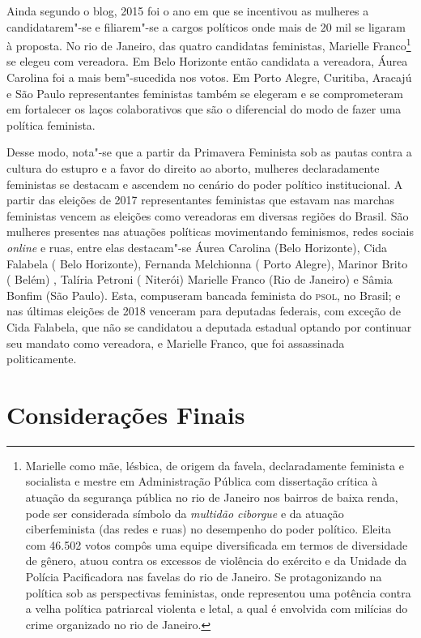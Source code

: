 Ainda segundo o blog, 2015 foi o ano em que se incentivou as mulheres a
candidatarem"-se e filiarem"-se a cargos políticos onde mais de 20 mil se
ligaram à proposta. No rio de Janeiro, das quatro candidatas feministas,
Marielle Franco\footnote{Marielle como mãe, lésbica, de origem da
  favela, declaradamente feminista e socialista e mestre em
  Administração Pública com dissertação crítica à atuação da segurança
  pública no rio de Janeiro nos bairros de baixa renda, pode ser
  considerada símbolo da \textit{multidão ciborgue} e da atuação ciberfeminista
  (das redes e ruas) no desempenho do poder político. Eleita com 46.502
  votos compôs uma equipe diversificada em termos de diversidade de
  gênero, atuou contra os excessos de violência do exército e da Unidade
  da Polícia Pacificadora nas favelas do rio de Janeiro. Se
  protagonizando na política sob as perspectivas feministas, onde
  representou uma potência contra a velha política patriarcal violenta e
  letal, a qual é envolvida com milícias do crime organizado no rio de
  Janeiro.} se elegeu com vereadora. Em Belo Horizonte então candidata a
vereadora, Áurea Carolina foi a mais bem"-sucedida nos votos. Em Porto
Alegre, Curitiba, Aracajú e São Paulo representantes feministas também
se elegeram e se comprometeram em fortalecer os laços colaborativos que
são o diferencial do modo de fazer uma política feminista.

Desse modo, nota"-se que a partir da Primavera Feminista sob as pautas
contra a cultura do estupro e a favor do direito ao aborto, mulheres
declaradamente feministas se destacam e ascendem no cenário do poder
político institucional. A partir das eleições de 2017 representantes
feministas que estavam nas marchas feministas vencem as eleições como
vereadoras em diversas regiões do Brasil. São mulheres presentes nas
atuações políticas movimentando feminismos, redes sociais \textit{\textit{online}} e ruas,
entre elas destacam"-se Áurea Carolina (Belo Horizonte), Cida Falabela (
Belo Horizonte), Fernanda Melchionna ( Porto Alegre), Marinor Brito (
Belém) , Talíria Petroni ( Niterói) Marielle Franco (Rio de Janeiro) e
Sâmia Bonfim (São Paulo). Esta, compuseram bancada feminista do \textsc{psol}, no
Brasil; e nas últimas eleições de 2018 venceram para deputadas federais,
com exceção de Cida Falabela, que não se candidatou a deputada estadual
optando por continuar seu mandato como vereadora, e Marielle Franco, que
foi assassinada politicamente.

\section{Considerações Finais}

